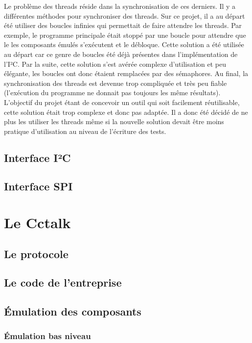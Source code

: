 \documentclass[a4paper]{article}
\begin{document}
Le problème des threads réside dans la synchronisation de ces derniers. Il y a
différentes méthodes pour synchroniser des threads. Sur ce projet, il a au
départ été utiliser des boucles infinies qui permettait de faire attendre les
threads. Par exemple, le programme principale était stoppé par une boucle pour
attendre que le les composants émulés s'exécutent et le débloque. Cette solution
a été utilisée au départ car ce genre de boucles été déjà présentes dans
l'implémentation de l'I²C. Par la suite, cette solution s'est avérée complexe
d'utilisation et peu élégante, les boucles ont donc étaient remplacées par des %
sémaphores. Au final, la synchronisation des threads est devenue trop compliquée
et très peu fiable (l'exécution du programme ne donnait pas toujours les même
résultats). L'objectif du projet étant de concevoir un outil qui soit facilement
réutilisable, cette solution était trop complexe et donc pas adaptée. Il a donc
été décidé de ne plus les utiliser les threads même si la nouvelle solution
devait être moins pratique d'utilisation au niveau de l'écriture des tests.

\subsection{Interface I²C}

\subsection{Interface SPI}

\section{Le Cctalk}

\subsection{Le protocole}

\subsection{Le code de l'entreprise}

\subsection{Émulation des composants}

\subsubsection{Émulation bas niveau}
\end{document}

